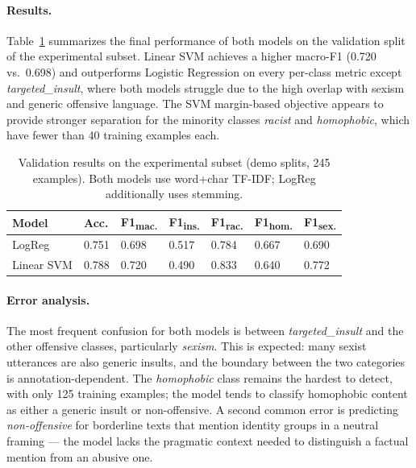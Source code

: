 \paragraph{Results.}
Table~\ref{tab:results} summarizes the final performance of both models on the validation split of the experimental subset. Linear SVM achieves a higher macro-F1 (0.720 vs.\ 0.698) and outperforms Logistic Regression on every per-class metric except \textit{targeted\_insult}, where both models struggle due to the high overlap with sexism and generic offensive language. The SVM margin-based objective appears to provide stronger separation for the minority classes \textit{racist} and \textit{homophobic}, which have fewer than 40 training examples each.

\begin{table}[H]
\centering
\footnotesize
\setlength{\tabcolsep}{3pt}
\begin{tabularx}{\columnwidth}{lXXXXXX}
\toprule
Model & Acc. & F1\textsubscript{mac.} & F1\textsubscript{ins.} & F1\textsubscript{rac.} & F1\textsubscript{hom.} & F1\textsubscript{sex.} \\
\midrule
LogReg     & 0.751 & 0.698 & 0.517 & 0.784 & 0.667 & 0.690 \\
Linear SVM & 0.788 & 0.720 & 0.490 & 0.833 & 0.640 & 0.772 \\
\bottomrule
\end{tabularx}
\caption{Validation results on the experimental subset (demo splits, 245 examples). Both models use word+char TF-IDF; LogReg additionally uses stemming.}
\label{tab:results}
\end{table}


\paragraph{Error analysis.}
The most frequent confusion for both models is between \textit{targeted\_insult} and the other offensive classes, particularly \textit{sexism}. This is expected: many sexist utterances are also generic insults, and the boundary between the two categories is annotation-dependent. The \textit{homophobic} class remains the hardest to detect, with only 125 training examples; the model tends to classify homophobic content as either a generic insult or non-offensive. A second common error is predicting \textit{non-offensive} for borderline texts that mention identity groups in a neutral framing — the model lacks the pragmatic context needed to distinguish a factual mention from an abusive one.

